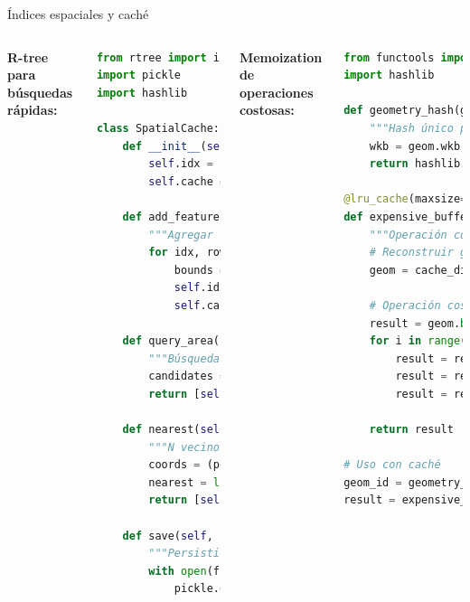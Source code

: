 \documentclass[10pt,aspectratio=169]{beamer}
\begin{document}
\begin{frame}[fragile]{Índices espaciales y caché}
    \begin{columns}[T]
        \textbf{R-tree para búsquedas rápidas:}
        \begin{lstlisting}[language=Python]
from rtree import index
import pickle
import hashlib

class SpatialCache:
    def __init__(self):
        self.idx = index.Index()
        self.cache = {}
        
    def add_features(self, features_gdf):
        """Agregar features al índice"""
        for idx, row in features_gdf.iterrows():
            bounds = row.geometry.bounds
            self.idx.insert(idx, bounds)
            self.cache[idx] = row
    
    def query_area(self, bbox):
        """Búsqueda rápida por bbox"""
        candidates = list(self.idx.intersection(bbox))
        return [self.cache[i] for i in candidates]
    
    def nearest(self, point, n=5):
        """N vecinos más cercanos"""
        coords = (point.x, point.y, point.x, point.y)
        nearest = list(self.idx.nearest(coords, n))
        return [self.cache[i] for i in nearest]
    
    def save(self, filename):
        """Persistir caché"""
        with open(filename, 'wb') as f:
            pickle.dump(self.cache, f)
        \end{lstlisting}
        
        \textbf{Memoization de operaciones costosas:}
        \begin{lstlisting}[language=Python]
from functools import lru_cache
import hashlib

def geometry_hash(geom):
    """Hash único para geometría"""
    wkb = geom.wkb
    return hashlib.md5(wkb).hexdigest()

@lru_cache(maxsize=1000)
def expensive_buffer_operation(geom_hash, distance):
    """Operación costosa con caché"""
    # Reconstruir geometría del hash
    geom = cache_dict[geom_hash]
    
    # Operación costosa
    result = geom.buffer(distance)
    for i in range(10):
        result = result.simplify(0.01)
        result = result.buffer(-distance/20)
        result = result.buffer(distance/20)
    
    return result

# Uso con caché
geom_id = geometry_hash(polygon)
result = expensive_buffer_operation(geom_id, 100)
        \end{lstlisting}
    \end{columns}
\end{frame}
\end{document}
